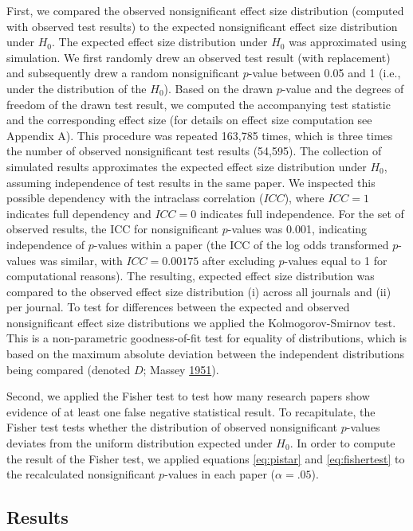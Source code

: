 \documentclass[a5paper]{book}
\begin{document}
First, we compared the observed nonsignificant effect size distribution
(computed with observed test results) to the expected nonsignificant
effect size distribution under \(H_0\). The expected effect size
distribution under \(H_0\) was approximated using simulation. We first
randomly drew an observed test result (with replacement) and
subsequently drew a random nonsignificant \(p\)-value between 0.05 and 1
(i.e., under the distribution of the \(H_0\)). Based on the drawn
\(p\)-value and the degrees of freedom of the drawn test result, we
computed the accompanying test statistic and the corresponding effect
size (for details on effect size computation see Appendix A). This
procedure was repeated 163,785 times, which is three times the number of
observed nonsignificant test results (54,595). The collection of
simulated results approximates the expected effect size distribution
under \(H_0\), assuming independence of test results in the same paper.
We inspected this possible dependency with the intraclass correlation
(\(ICC\)), where \(ICC=1\) indicates full dependency and \(ICC=0\)
indicates full independence. For the set of observed results, the ICC
for nonsignificant \(p\)-values was 0.001, indicating independence of
\(p\)-values within a paper (the ICC of the log odds transformed
\(p\)-values was similar, with \(ICC=0.00175\) after excluding
\(p\)-values equal to 1 for computational reasons). The resulting,
expected effect size distribution was compared to the observed effect
size distribution (i) across all journals and (ii) per journal. To test
for differences between the expected and observed nonsignificant effect
size distributions we applied the Kolmogorov-Smirnov test. This is a
non-parametric goodness-of-fit test for equality of distributions, which
is based on the maximum absolute deviation between the independent
distributions being compared (denoted \(D\); Massey
\protect\hyperlink{ref-doi:10.2307ux2f2280095}{1951}).

Second, we applied the Fisher test to test how many research papers show
evidence of at least one false negative statistical result. To
recapitulate, the Fisher test tests whether the distribution of observed
nonsignificant \(p\)-values deviates from the uniform distribution
expected under \(H_0\). In order to compute the result of the Fisher
test, we applied equations \eqref{eq:pistar} and \eqref{eq:fishertest} to
the recalculated nonsignificant \(p\)-values in each paper
(\(\alpha=.05\)).

\subsection{Results}\label{results}
\end{document}
